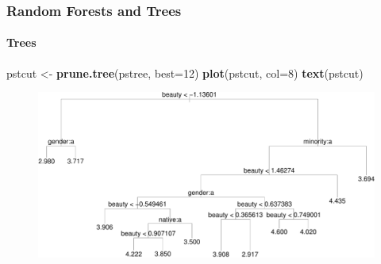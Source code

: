 \documentclass[
  shownotes,
  xcolor={svgnames},
  hyperref={colorlinks,citecolor=DarkBlue,linkcolor=DarkRed,urlcolor=DarkBlue}
  , aspectratio=169]{beamer}
\newenvironment{Shaded}{\begin{snugshade}}{\end{snugshade}}
\newcommand{\DataTypeTok}[1]{\textcolor[rgb]{0.13,0.29,0.53}{#1}}
\newcommand{\DecValTok}[1]{\textcolor[rgb]{0.00,0.00,0.81}{#1}}
\newcommand{\KeywordTok}[1]{\textcolor[rgb]{0.13,0.29,0.53}{\textbf{#1}}}
\newcommand{\NormalTok}[1]{#1}
\newcommand{\StringTok}[1]{\textcolor[rgb]{0.31,0.60,0.02}{#1}}
\begin{document}
\begin{frame}[fragile]
\frametitle{Random Forests and Trees}
\framesubtitle{Trees}

\begin{scriptsize}
\begin{Shaded}
\begin{Highlighting}[]
\NormalTok{pstcut \textless{}{-}}\StringTok{ }\KeywordTok{prune.tree}\NormalTok{(pstree, }\DataTypeTok{best=}\DecValTok{12}\NormalTok{)}
\KeywordTok{plot}\NormalTok{(pstcut, }\DataTypeTok{col=}\DecValTok{8}\NormalTok{)}
\KeywordTok{text}\NormalTok{(pstcut)}
\end{Highlighting}
\end{Shaded}

\end{scriptsize}
\begin{figure}[H] \centering
            \captionsetup{justification=centering}
              \includegraphics[scale=0.4]{figures/unnamed-chunk-6-1.pdf}              
 \end{figure}


\end{frame}
\end{document}
